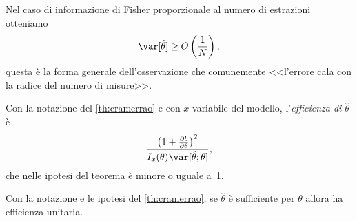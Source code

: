 Nel caso di informazione di Fisher proporzionale al numero di estrazioni otteniamo
\begin{equation*}
	\var[\hat\theta] \ge O \left(\frac1N\right),
\end{equation*}
questa è la forma generale dell'osservazione che comunemente
<<l'errore cala con la radice del numero di misure>>.

\begin{definition}[Efficienza]
	Con la notazione del \autoref{th:cramerrao} e con $x$ variabile del modello,
	l'\emph{efficienza di $\hat\theta$} è
	\begin{equation*}
		\frac{\left( 1 + \frac{\partial b}{\partial\theta} \right)^2}{I_x(\theta)\var[\hat\theta;\theta]},
	\end{equation*}
	che nelle ipotesi del teorema è minore o uguale a~1.
\end{definition}

\begin{theorem}
	\label{th:suffeff}
	Con la notazione e le ipotesi del \autoref{th:cramerrao},
	se $\hat\theta$ è sufficiente per $\theta$ allora ha efficienza unitaria.
\end{theorem}

